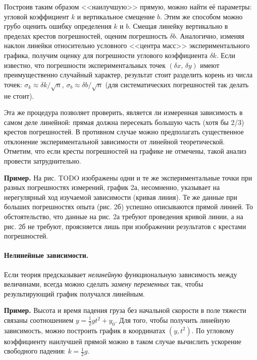 Построив таким образом <<наилучшую>> прямую,
можно найти её параметры: угловой коэффициент $k$ и вертикальное
смещение $b$. Этим же способом можно грубо оценить ошибку определения
$k$ и $b$. Смещая линейку вертикально в пределах крестов погрешностей,
оценим погрешность $\delta b$. Аналогично, изменяя наклон линейки
относительно условного <<центра масс>>
экспериментального графика, получим оценку для погрешности углового
коэффициента $\delta k$. Если известно, что погрешности экспериментальных
точек $\left(\delta x,\,\delta y\right)$ имеют преимущественно случайный
характер, результат стоит разделить корень из числа точек: $\sigma_{k}\approx\delta k/\sqrt{n}$,
$\sigma_{b}\approx\delta b/\sqrt{n}$ (для систематических погрешностей
так делать не стоит).

Эта же процедура позволяет проверить, является ли измеренная зависимость
в самом деле линейной: прямая должна пересекать большую часть (хотя
бы 2/3) крестов погрешностей. В противном случае можно предполагать
существенное отклонение экспериментальной зависимости от линейной
теоретической. Отметим, что если кресты погрешностей на графике не
отмечены, такой анализ провести затруднительно. 

\textbf{\footnotesize{}Пример.}{\footnotesize{} На рис. TODO изображены
одни и те же экспериментальные точки при разных погрешностях измерений,
график 2а, несомненно, указывает на нерегулярный ход изучаемой зависимости
(кривая линия). Те же данные при больших погрешностях опыта (рис.
2б) успешно описываются прямой линией. То обстоятельство, что данные
на рис. 2а требуют проведения кривой линии, а на рис. 2б не требуют,
проясняется лишь при изображении результатов с крестами погрешностей.}{\footnotesize\par}

\paragraph{Нелинейные зависимости.}

Если теория предсказывает \emph{нелинейную }функциональную зависимость
между величинами, всегда можно сделать \emph{замену переменных} так,
чтобы результирующий график получался линейным.

\textbf{\footnotesize{}Пример.}{\footnotesize{} Высота и время падения
груза без начальной скорости в поле тяжести связаны соотношением $y=\frac{1}{2}gt^{2}+y_{0}$.
Для того, чтобы получить линейную зависимость, можно построить график
в координатах $\left(y,t^{2}\right)$. По угловому коэффициенту наилучшей
прямой можно в таком случае вычислить ускорение свободного падения:
$k=\frac{1}{2}g$.}{\footnotesize\par}

